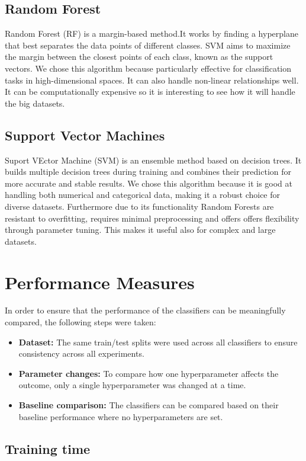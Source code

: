 \documentclass{article}
\begin{document}
\subsection{Random Forest}
Random Forest (RF) is a margin-based method.It works by finding a hyperplane that best separates the data points of different classes. SVM aims to maximize the margin between the closest points of each class, known as the support vectors. We chose this algorithm because particularly effective for classification tasks in high-dimensional spaces. It can also handle non-linear relationships well.  It can be computationally expensive so it is interesting to see how it will handle the big datasets. 


\subsection{Support Vector Machines}
Suport VEctor Machine (SVM) is an ensemble  method based on decision trees. It builds multiple decision trees during training and combines their prediction for more accurate and stable results. We chose this algorithm because it is good at handling both numerical and categorical data, making it a robust choice for diverse datasets. Furthermore due to its functionality Random Forests are resistant to overfitting, requires minimal preprocessing and offers offers flexibility through parameter tuning. This makes it useful also for complex and large datasets.

\section{Performance Measures}
In order to ensure that the performance of the classifiers can be meaningfully compared, the following steps were taken:
\begin{itemize}
    \item \textbf{Dataset:} The same train/test splits were used across all classifiers to ensure consistency across all experiments.
    \item \textbf{Parameter changes:} To compare how one hyperparameter affects the outcome, only a single hyperparameter was changed at a time.
    \item \textbf{Baseline comparison:} The classifiers can be compared based on their baseline performance where no hyperparameters are set.
\end{itemize}

\subsection{Training time}
\end{document}
